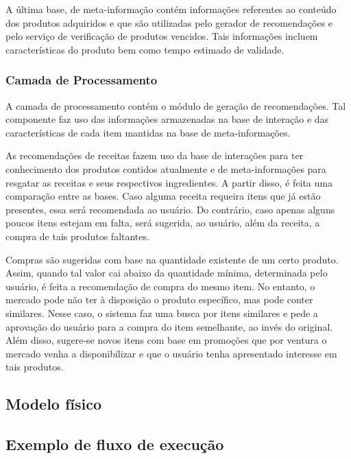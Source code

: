 A última base, de meta-informação contém informações referentes ao conteúdo dos produtos adquiridos e que são utilizadas pelo gerador de recomendações e pelo serviço de verificação de produtos vencidos. Tais informações incluem características do produto bem como tempo estimado de validade.

\subsubsection{Camada de Processamento}

A camada de processamento contém o módulo de geração de recomendações. Tal componente faz uso das informações armazenadas na base de interação e das características de cada item mantidas na base de meta-informações.

As recomendações de receitas fazem uso da base de interações para ter conhecimento dos produtos contidos atualmente e de meta-informações para resgatar as receitas e seus respectivos ingredientes. A partir disso, é feita uma comparação entre as bases. Caso alguma receita requeira itens que já estão presentes, essa será recomendada ao usuário. Do contrário, caso apenas alguns poucos itens estejam em falta, será sugerida, ao usuário, além da receita, a compra de tais produtos faltantes.

Compras são sugeridas com base na quantidade existente de um certo produto. Assim, quando tal valor cai abaixo da quantidade mínima, determinada pelo usuário, é feita a recomendação de compra do mesmo item. No entanto, o mercado pode não ter à disposição o produto específico, mas pode conter similares. Nesse caso, o sistema faz uma busca por itens similares e pede a aprovação do usuário para a compra do item semelhante, ao invés do original. Além disso, sugere-se novos itens com base em promoções que por ventura o mercado venha a disponibilizar e que o usuário tenha apresentado interesse em tais produtos.

\subsection{Modelo físico}


\subsection{Exemplo de fluxo de execução}